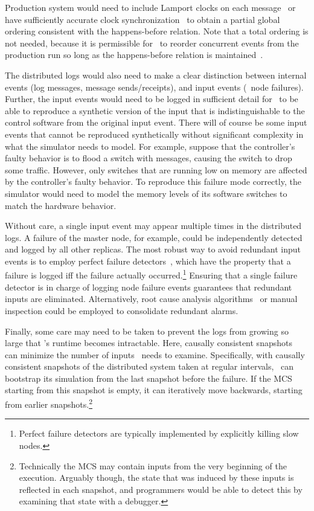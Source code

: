 Production system would need to include Lamport
clocks on each message~\cite{Lamport:1978:TCO:359545.359563} or have
sufficiently accurate clock
synchronization~\cite{corbett2012spanner} to obtain a partial global ordering
consistent with the happens-before relation.
Note that a total ordering is not needed, because it is permissible
for \simulator~to reorder concurrent events from
the production run so long as the happens-before relation is
maintained~\cite{Fischer:1985:IDC:3149.214121}.

The distributed logs would also need to make a clear distinction between internal events
(log messages, message sends/receipts), and input events (\eg~node failures). Further,
the input events would need to be logged in sufficient detail for \simulator~to be able to
reproduce a synthetic version of the input that is indistinguishable to the control software
from the original input event. There will of course be some input events that cannot be reproduced
synthetically without significant complexity in what the simulator needs to model.
For example, suppose that the controller's faulty behavior is to flood a switch with messages,
causing the switch to drop some traffic. However, only switches that are running low on memory
are affected by the controller's faulty behavior. To reproduce this failure mode correctly,
the simulator would need to model the memory levels of its software switches to match the hardware behavior.

Without care, a single input event may appear multiple times in the
distributed logs. A failure of the master node, for example, could be independently
detected and logged by all other replicas. The most robust way to
avoid redundant input events is to employ perfect failure
detectors~\cite{chandra1996unreliable}, which have the property that a
failure is logged iff
the failure actually occurred.\footnote{Perfect failure detectors are
typically implemented by explicitly killing slow
nodes.} Ensuring that a single failure detector is in charge of logging node failure
events guarantees that redundant inputs are eliminated. Alternatively, root cause analysis
algorithms~\cite{577079} or manual inspection could be employed to consolidate redundant
alarms.

Finally, some care may need to be taken to prevent the logs from growing so large that
\simulator's runtime becomes intractable. Here, causally consistent
snapshots~\cite{Chandy:1985:DSD:214451.214456} can minimize the number of inputs \simulator~needs
to examine. Specifically, with causally consistent snapshots of the distributed
system taken at regular intervals, \simulator~can bootstrap its simulation from the last snapshot before the failure.
If the MCS starting from this snapshot is empty, it can iteratively move backwards, starting from earlier
snapshots.\footnote{Technically the MCS may contain inputs from the very beginning of the execution. Arguably though,
the state that was induced by these inputs is reflected in each snapshot, and programmers would be able to detect
this by examining that state with a debugger.}

